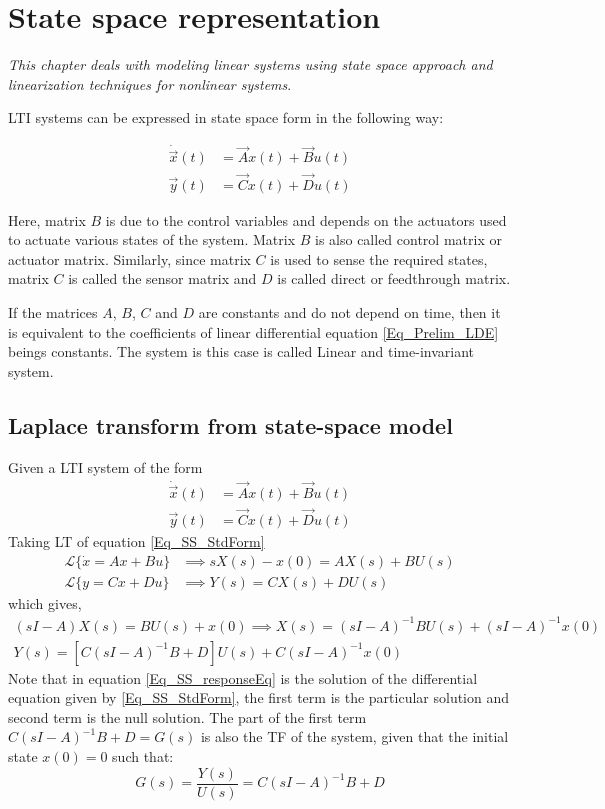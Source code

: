 \chapter{State space representation}

\textit{This chapter deals with modeling linear systems using state space approach and linearization techniques for nonlinear systems}.

LTI systems can be expressed in state space form in the following way:

\begin{align}
	\dot{\vec{x}}(t) &= \vec{A} x(t) + \vec{B} u(t) \\
	\vec{y}(t) &= \vec{C} x(t) + \vec{D} u(t)
\end{align}

Here, matrix $B$ is due to the control variables and depends on the actuators used to actuate various states of the system. Matrix $B$ is also called control matrix or actuator matrix. Similarly, since matrix $C$ is used to sense the required states, matrix $C$ is called the sensor matrix and $D$ is called direct or feedthrough matrix.

If the matrices $A$, $B$, $C$ and $D$ are constants and do not depend on time, then it is equivalent to the coefficients of linear differential equation \eqref{Eq_Prelim_LDE} beings constants. The system is this case is called Linear and time-invariant system.

\section{Laplace transform from state-space model} \label{Sec_LT_of_StSpModel}

Given a LTI system of the form
\begin{align}\label{Eq_SS_StdForm}
	\dot{\vec{x}}(t) &= \vec{A} x(t) + \vec{B} u(t) \\
	\vec{y}(t) &= \vec{C} x(t) + \vec{D} u(t)
\end{align}
Taking LT of equation \eqref{Eq_SS_StdForm}
\begin{align}
	\mathcal{L} \{ \dot{x} = Ax + Bu \} &\implies s X(s) - x(0) = A X(s) + B U(s) \\
	\mathcal{L} \{ y = C x + D u \} &\implies Y(s) = C X(s) + D U(s)
\end{align}
which gives,
\begin{align}
	(sI - A)X(s) = B U(s) + x(0) \implies X(s) = (sI - A)^{-1} B U(s) + (sI - A)^{-1} x(0) \\
	Y(s) = [C(sI - A)^{-1} B + D] U(s) + C(sI - A)^{-1} x(0) \label{Eq_SS_responseEq}
\end{align}
Note that in equation \eqref{Eq_SS_responseEq} is the solution of the differential equation given by \eqref{Eq_SS_StdForm}, the first term is the particular solution and second term is the null solution. The part of the first term $C(sI - A)^{-1} B + D = G(s)$ is also the TF of the system, given that the initial state $x(0) = 0$ such that:
\begin{equation*}
	G(s) = \frac{Y(s)}{U(s)} = C(sI - A)^{-1} B + D
\end{equation*}

